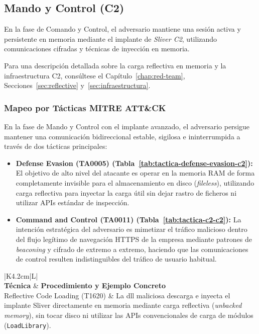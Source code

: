 \newpage
\subsection{Mando y Control (C2)} \label{sec:comando-control}

En la fase de Comando y Control, el adversario mantiene una sesión activa y persistente en memoria mediante el implante de \textit{Sliver C2}, utilizando comunicaciones cifradas y técnicas de inyección en memoria.

Para una descripción detallada sobre la carga reflectiva en memoria y la infraestructura C2, consúltese el Capítulo~\ref{chap:red-team}, Secciones~\ref{sec:reflective} y~\ref{sec:infraestructura}.

\subsubsection{Mapeo por Tácticas MITRE ATT\&CK}

En la fase de Mando y Control con el implante avanzado, el adversario persigue mantener una comunicación bidireccional estable, sigilosa e ininterrumpida a través de dos tácticas principales:

\begin{itemize}
    \item \textbf{Defense Evasion (TA0005) (Tabla~\ref{tab:tactica-defense-evasion-c2}):} El objetivo de alto nivel del atacante es operar en la memoria RAM de forma completamente invisible para el almacenamiento en disco (\textit{fileless}), utilizando carga reflectiva para inyectar la carga útil sin dejar rastro de ficheros ni utilizar APIs estándar de inspección.
    
    \item \textbf{Command and Control (TA0011) (Tabla~\ref{tab:tactica-c2-c2}):} La intención estratégica del adversario es mimetizar el tráfico malicioso dentro del flujo legítimo de navegación HTTPS de la empresa mediante patrones de \textit{beaconing} y cifrado de extremo a extremo, haciendo que las comunicaciones de control resulten indistinguibles del tráfico de usuario habitual.
\end{itemize}

\begin{table}[htbp]
    \centering
    \caption{Táctica: Defense Evasion (TA0005) — Fase de Comando y Control}
    \label{tab:tactica-defense-evasion-c2}
    \renewcommand{\arraystretch}{1.3}
    \small
    \begin{tabularx}{\textwidth}{|K{4.2cm}|L|}
        \hline
         \\ \hline
        \textbf{Técnica} & \textbf{Procedimiento y Ejemplo Concreto} \\ \hline
        Reflective Code Loading (T1620) & La \acrshort{dll} maliciosa descarga e inyecta el implante Sliver directamente en memoria mediante carga reflectiva (\textit{unbacked memory}), sin tocar disco ni utilizar las APIs convencionales de carga de módulos (\texttt{LoadLibrary}). \\ \hline
    \end{tabularx}
\end{table}

